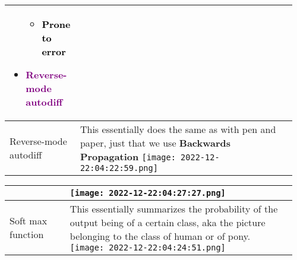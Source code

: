 \documentclass[main.tex,fontsize=8pt,paper=a4,paper=portrait,DIV=calc,]{scrartcl}
\begin{document}
\begin{table}[ht!]
\begin{tabular}{|m{0.2\linewidth}|m{0.755\linewidth}|}
\begin{itemize}
\begin{itemize}
  \item \textcolor{black}{Prone to error}
  \end{itemize} 
\item \textcolor{purple}{Reverse-mode autodiff}
\vspace{-3mm}
\end{itemize} 
\\
\hline
Reverse-mode autodiff  & 
This essentially does the same as with pen and paper, just that we use \textbf{Backwards Propagation}\newline
\texttt{[image: 2022-12-22:04:22:59.png]}
\\
\hline
\end{tabular}
\end{table}
\pagebreak
\begin{table}[ht!]
\begin{tabular}{|m{0.2\linewidth}|m{0.755\linewidth}|}
\hline
&
\vspace{2mm}
\texttt{[image: 2022-12-22:04:27:27.png]}\\
\hline
Soft max function & 
This essentially summarizes the probability of the output being of a certain class, aka the picture belonging to the class of human or of pony.\newline
\texttt{[image: 2022-12-22:04:24:51.png]}
\\
\hline
\end{tabular}
\end{table}
\end{document}
